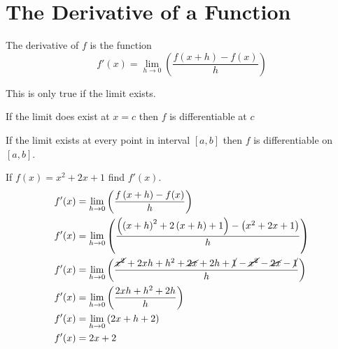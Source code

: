 
\section{The Derivative of a Function}
\begin{theorem}[Derivative]
    The derivative of $f$ is the function
    \begin{equation}
        f'(x) = \lim_{h \to 0}\left(\dfrac{f\left(x + h\right) - f(x)}{h}\right)
    \end{equation}
\end{theorem}
\begin{remark}
    This is only true if the limit exists.
\end{remark}
\begin{corollary}
    If the limit does exist at $x=c$ then $f$ is differentiable at $c$
\end{corollary}
\begin{corollary}
    If the limit exists at every point in interval $\left[a, b\right]$ then $f$ is differentiable on $\left[a, b\right]$. \\
\end{corollary}
\begin{example}
    If $f(x) = x^2 + 2x + 1$ find $f'(x)$.
    \begin{align*}
        f'(x) &= \lim_{h \to 0}\left(\dfrac{f\left(x + h\right) - f(x)}{h}\right) \\
        f'(x) &= \lim_{h \to 0}\left(\dfrac{\left(\left(x+h\right)^2 + 2\left(x + h\right) +1 \right) - \left(x^2 + 2x + 1\right)}{h}\right)\\
        f'(x) &= \lim_{h \to 0}\left(\dfrac{\cancel{x^2} + 2xh + h^2 + \cancel{2x} + 2h + \cancel{1} - \cancel{x^2} - \cancel{2x} - \cancel{1}}{h} \right) \\
        f'(x) &= \lim_{h \to 0}\left( \dfrac{2xh + h^2 + 2h}{h} \right) \\
        f'(x) &= \lim_{h \to 0}\left( 2x + h + 2 \right) \\
        f'(x) &= 2x + 2
    \end{align*}
\end{example}
